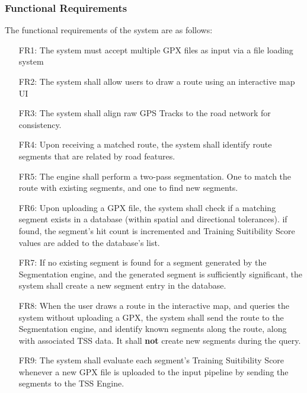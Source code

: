 \documentclass[11pt,twoside]{report}
\begin{document}
\subsubsection{Functional Requirements}
The functional requirements of the system are as follows:
\begin{enumerate}
	\item[FR1:] The system must accept multiple GPX files as input via a file loading system
	\item[FR2:] The system shall allow users to draw a route using an interactive map UI
	\item[FR3:] The system shall align raw GPS Tracks to the road network for consistency.
	\item[FR4:] Upon receiving a matched route, the system shall identify route segments that are related by road features.
	\item[FR5:] The engine shall perform a two-pass segmentation. One to match the route with existing segments, and one to find new segments.
	\item[FR6:] Upon uploading a GPX file, the system shall check if a matching segment exists in a database (within spatial and directional tolerances).
	      if found, the segment's hit count is incremented and Training Suitibility Score values are added to the database's list.
	\item[FR7:] If no existing segment is found for a segment generated by the Segmentation engine, and the generated segment is sufficiently significant,
	      the system shall create a new segment entry in the database.
	\item[FR8:] When the user draws a route in the interactive map, and queries the system without uploading a GPX, the system shall send the route
	      to the Segmentation engine, and identify known segments along the route, along with associated TSS data. It shall \textbf{not} create new segments during the query.
	\item[FR9:] The system shall evaluate each segment's Training Suitibility Score whenever a new GPX file is uploaded to the input pipeline by sending
	      the segments to the TSS Engine.
\end{enumerate}
\end{document}
